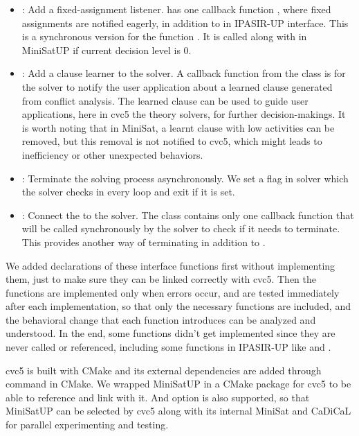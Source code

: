 \begin{itemize}
\begin{itemize}
    \item {}: Add a fixed-assignment listener.  has one callback function , where fixed assignments are notified eagerly, in addition to  in IPASIR-UP interface. This is a synchronous version for the function . It is called along with  in MiniSatUP if current decision level is 0.
    \item {}: Add a clause learner to the solver. A callback function  from the  class is for the solver to notify the user application about a learned clause generated from conflict analysis. The learned clause can be used to guide user applications, here in cvc5 the theory solvers, for further decision-makings. It is worth noting that in MiniSat, a learnt clause with low activities can be removed, but this removal is not notified to cvc5, which might leads to inefficiency or other unexpected behaviors.
    \item {}: Terminate the solving process asynchronously. We set a flag in solver which the solver checks in every loop and exit if it is set.
    \item {}: Connect the  to the solver. The  class contains only one callback function  that will be called synchronously by the solver to check if it needs to terminate. This provides another way of terminating in addition to .
  \end{itemize}
\end{itemize}

We added declarations of these interface functions first without implementing them, just to make sure they can be linked correctly with cvc5. Then the functions are implemented only when errors occur, and are tested immediately after each implementation, so that only the necessary functions are included, and the behavioral change that each function introduces can be analyzed and understood. In the end, some functions didn't get implemented since they are never called or referenced, including some functions in IPASIR-UP like  and .

cvc5 is built with CMake and its external dependencies are added through command  in CMake. We wrapped MiniSatUP in a CMake package for cvc5 to be able to reference and link with it. And option  is also supported, so that MiniSatUP can be selected by cvc5 along with its internal MiniSat and CaDiCaL for parallel experimenting and testing.
